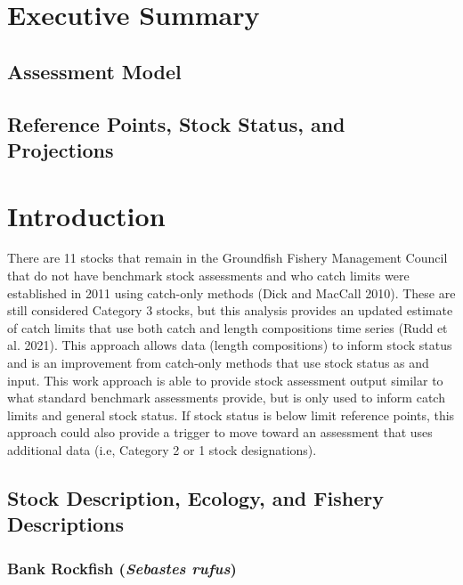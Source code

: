 \documentclass[
  letterpaper,
]{article}
\begin{document}
\newpage{}

\section{Executive Summary}\label{sec-exec-sum}

\subsection{Assessment Model}\label{sec-assessment-model}

\subsection{Reference Points, Stock Status, and
Projections}\label{sec-reference-points-stock-status-and-projections}

\newpage{}

\section{Introduction}\label{sec-intro}

There are 11 stocks that remain in the Groundfish Fishery Management
Council that do not have benchmark stock assessments and who catch
limits were established in 2011 using catch-only methods (Dick and
MacCall 2010). These are still considered Category 3 stocks, but this
analysis provides an updated estimate of catch limits that use both
catch and length compositions time series (Rudd et al. 2021). This
approach allows data (length compositions) to inform stock status and is
an improvement from catch-only methods that use stock status as and
input. This work approach is able to provide stock assessment output
similar to what standard benchmark assessments provide, but is only used
to inform catch limits and general stock status. If stock status is
below limit reference points, this approach could also provide a trigger
to move toward an assessment that uses additional data (i.e, Category 2
or 1 stock designations).

\subsection{Stock Description, Ecology, and Fishery
Descriptions}\label{sec-stock-stuff}

\subsubsection{\texorpdfstring{Bank Rockfish (\emph{Sebastes
rufus})}{Bank Rockfish (Sebastes rufus)}}\label{bank-rockfish-sebastes-rufus}
\end{document}
